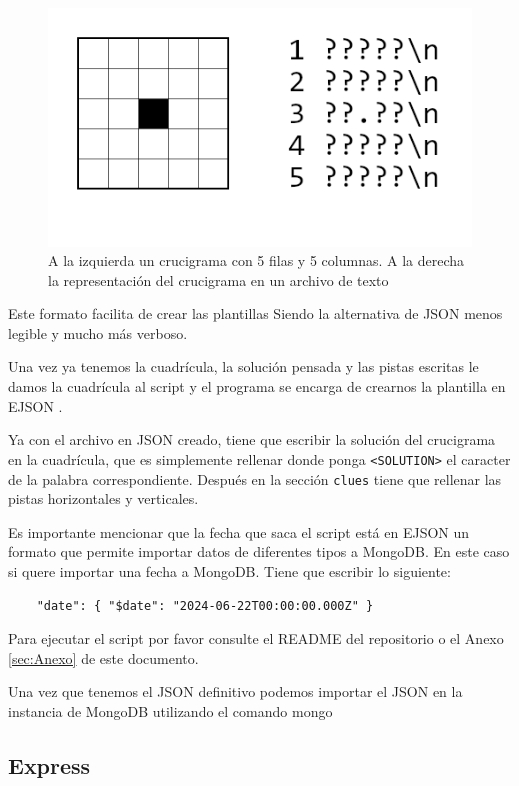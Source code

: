 \documentclass[12pt, a4paper]{article}
\begin{document}
\begin{figure}[t]
	\centering
	\label{fig:xwordCustomFormat}
	\includegraphics[width=0.7\linewidth]{img/formato.png}
	\caption{A la izquierda un crucigrama con 5 filas y 5 columnas.
		A la derecha la representación del crucigrama en un archivo de texto}
\end{figure}

Este formato facilita de crear las plantillas Siendo la alternativa de JSON
menos legible y mucho más verboso.

Una vez ya tenemos la cuadrícula, la solución pensada y las pistas escritas
le damos la cuadrícula al script y el programa se encarga de crearnos la plantilla
en EJSON \cite{EJSON}.

Ya con el archivo en JSON creado, tiene que escribir la solución del crucigrama en
la cuadrícula, que es simplemente rellenar donde ponga \verb*|<SOLUTION>| el caracter 
de la palabra correspondiente. Después en la sección \verb*|clues| tiene que rellenar 
las pistas horizontales y verticales. 

Es importante mencionar que la fecha que saca el script está en EJSON \cite{EJSON}
un formato que permite importar datos de diferentes tipos a MongoDB. En este caso
si quere importar una fecha a MongoDB. Tiene que escribir lo siguiente: 

\begin{verbatim}
	"date": { "$date": "2024-06-22T00:00:00.000Z" }
\end{verbatim}

Para ejecutar el script por favor consulte el README del repositorio \cite{repositorio}
o el Anexo \ref{sec:Anexo} de este documento.

Una vez que tenemos el JSON definitivo podemos importar el JSON en la instancia de
MongoDB utilizando el comando mongo


\subsection{Express}
\end{document}
